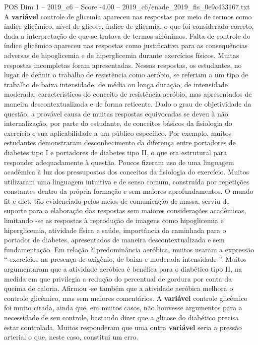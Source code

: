 \begin{textsample}{POS Dim 1 – 2019\_c6 – Score -4.00 – 2019\_c6/enade\_2019\_fis\_0e9c433167.txt}
A \textbf{variável} controle de glicemia apareceu nas respostas por meio de termos como índice glicêmico, nível de glicose, índice de glicemia, o que foi considerado correto, dada a interpretação de que se tratava de termos sinônimos.
Falta de controle do índice glicêmico apareceu nas respostas como justificativa para as consequências adversas de hipoglicemia e de hiperglicemia durante exercícios físicos.
Muitas respostas incompletas foram apresentadas.
Nessas respostas, os estudantes, no lugar de definir o trabalho de resistência como aeróbio, se referiam a um tipo de trabalho de baixa intensidade, de média ou longa duração, de intensidade moderada, característicos do conceito de resistência aeróbio, mas apresentados de maneira descontextualizada e de forma reticente.
Dado o grau de objetividade da questão, a provável causa de muitas respostas equivocadas se deveu à não internalização, por parte do estudante, de conceitos básicos da fisiologia do exercício e sua aplicabilidade a um público específico.
Por exemplo, muitos estudantes demonstraram desconhecimento da diferença entre portadores de diabetes tipo I e portadores de diabetes tipo II, o que era estrutural para responder adequadamente à questão.
Poucos fizeram uso de uma linguagem acadêmica à luz dos pressupostos dos conceitos da fisiologia do exercício.
Muitos utilizaram uma linguagem intuitiva e de senso comum, construída por repetições constantes dentro da própria formação e sem maiores aprofundamentos.
O mundo fit e diet, tão evidenciado pelos meios de comunicação de massa, serviu de suporte para a elaboração das respostas sem maiores considerações acadêmicas, limitando -se as respostas à reprodução de imagens como hipoglicemia e hiperglicemia, atividade física e saúde, importância da caminhada para o portador de diabetes, apresentados de maneira descontextualizada e sem fundamentação.
Em relação à predominância aeróbica, muitos usaram a expressão “ exercícios na presença de oxigênio, de baixa e moderada intensidade ”.
Muitos argumentaram que a atividade aeróbica é benéfica para o diabético tipo II, na medida em que privilegia a redução do percentual de gordura por conta da queima de caloria.
Afirmou -se também que a atividade aeróbica melhora o controle glicêmico, mas sem maiores comentários.
A \textbf{variável} controle glicêmico foi muito citada, ainda que, em muitos casos, não houvesse argumentos para a necessidade de seu controle, bastando dizer que a glicose do diabético precisa estar controlada.
Muitos responderam que uma outra \textbf{variável} seria a pressão arterial o que, neste caso, constitui um erro.

\end{textsample}
